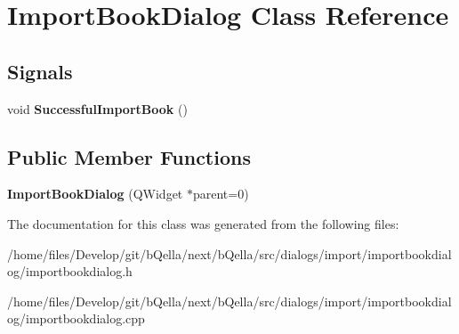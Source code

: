 \hypertarget{classImportBookDialog}{
\section{ImportBookDialog Class Reference}
\label{classImportBookDialog}
}
\subsection*{Signals}
\begin{DoxyCompactItemize}
\item 
\hypertarget{classImportBookDialog_af589ba0e57ef0c0e953f04dde1a57577}{
void {\bfseries SuccessfulImportBook} ()}
\label{classImportBookDialog_af589ba0e57ef0c0e953f04dde1a57577}

\end{DoxyCompactItemize}
\subsection*{Public Member Functions}
\begin{DoxyCompactItemize}
\item 
\hypertarget{classImportBookDialog_a500182b48edfd46b41d19ccdda832070}{
{\bfseries ImportBookDialog} (QWidget $\ast$parent=0)}
\label{classImportBookDialog_a500182b48edfd46b41d19ccdda832070}

\end{DoxyCompactItemize}


The documentation for this class was generated from the following files:\begin{DoxyCompactItemize}
\item 
/home/files/Develop/git/bQella/next/bQella/src/dialogs/import/importbookdialog/importbookdialog.h\item 
/home/files/Develop/git/bQella/next/bQella/src/dialogs/import/importbookdialog/importbookdialog.cpp\end{DoxyCompactItemize}
